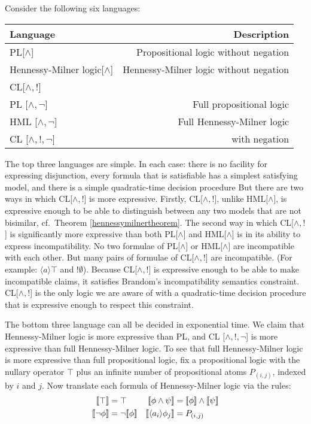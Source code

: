 Consider the following six languages:



\begin{center}
\begin{tabular}{ l | r }
Language & Description \\
\hline
PL[$\land$] & Propositional logic without negation \\
Hennessy-Milner logic[$\land$] & Hennessy-Milner logic without negation \\
CL[$\land, !$] & \Cathoristic{} \\
PL [$\land, \neg$] & Full propositional logic \\
HML [$\land, \neg$] & Full Hennessy-Milner logic \\
CL [$\land, !, \neg$] & \Cathoristic{} with negation\\
\end{tabular}
\end{center}


\NI The top three languages are simple. In each case: there is no
facility for expressing disjunction, every formula that is satisfiable
has a simplest satisfying model, and there is a simple quadratic-time
decision procedure But there are two ways in which CL[$\land, !$] is
more expressive.  Firstly, CL[$\land, !$], unlike HML[$\land$], is expressive enough to be able to distinguish
between any two models that are not bisimilar, cf.~Theorem
\ref{hennessymilnertheorem}.  The second way in which
CL[$\land, !$] is significantly more expressive than both PL[$\land$]
and HML[$\land$] is in its ability to express incompatibility.  No two
formulae of PL[$\land$] or HML[$\land$] are incompatible with each
other.  But many
pairs of formulae of CL[$\land, !$] are incompatible.  (For example:
$\langle a \rangle \top$ and $! \emptyset$).  Because CL[$\land, !$] is
expressive enough to be able to make incompatible claims, it satisfies
Brandom's incompatibility semantics constraint.
CL[$\land, !$] is the only logic we are aware of with a
quadratic-time decision procedure that is expressive enough to respect
this constraint. 

The bottom three language can all be decided in exponential time.  We
claim that Hennessy-Milner logic is more expressive than PL, and CL
[$\land, !, \neg$] is more expressive than full Hennessy-Milner logic.
To see that full Hennessy-Milner logic is more expressive than full
propositional logic, fix a propositional logic with the nullary
operator $\top$ plus an infinite number of propositional atoms
$P_{(i,j)}$, indexed by $i$ and $j$.  Now translate each formula of
Hennessy-Milner logic via the rules:
\begin{align*}
  \SEMB{\top}  & =  \top  &
  \SEMB{\phi \land \psi} & =  \SEMB{\phi} \land \SEMB{\psi}  \\
  \SEMB{\neg \phi} & =  \neg \SEMB{\phi}   &
  \SEMB{\langle a_i \rangle \phi_j} & =  P_{(i,j)} 
\end{align*}

